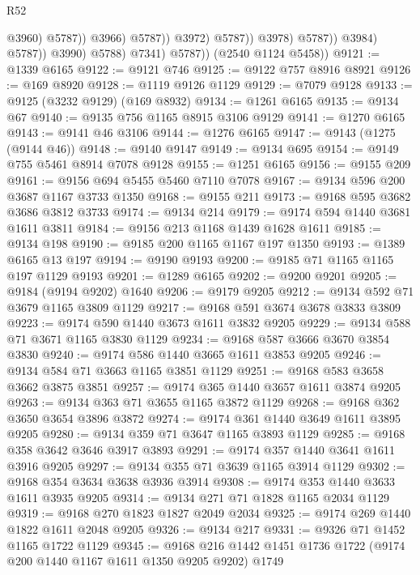 \begin{lexlean}{R52}
\begin{coremodule}
                                              @3960)
                                            @5787))
                                        @3966)
                                      @5787))
                                  @3972)
                                @5787))
                            @3978)
                          @5787))
                      @3984)
                    @5787))
                @3990)
              @5788)
            @7341)
          @5787))
      (@2540 @1124 @5458))
@9121 := @1339 @6165
@9122 := @9121 @746
@9125 := @9122 @757 @8916 @8921
@9126 := @169 @8920
@9128 := @1119 @9126 @1129
@9129 := @7079 @9128
@9133 := @9125 (@3232 @9129) (@169 @8932)
@9134 := @1261 @6165
@9135 := @9134 @67
@9140 := @9135 @756 @1165 @8915 @3106 @9129
@9141 := @1270 @6165
@9143 := @9141 @46 @3106
@9144 := @1276 @6165
@9147 := @9143 (@1275 (@9144 @46))
@9148 := @9140 @9147
@9149 := @9134 @695
@9154 := @9149 @755 @5461 @8914 @7078 @9128
@9155 := @1251 @6165
@9156 := @9155 @209
@9161 := @9156 @694 @5455 @5460 @7110 @7078
@9167 := @9134 @596 @200 @3687 @1167 @3733 @1350
@9168 := @9155 @211
@9173 := @9168 @595 @3682 @3686 @3812 @3733
@9174 := @9134 @214
@9179 := @9174 @594 @1440 @3681 @1611 @3811
@9184 := @9156 @213 @1168 @1439 @1628 @1611
@9185 := @9134 @198
@9190 := @9185 @200 @1165 @1167 @197 @1350
@9193 := @1389 @6165 @13 @197
@9194 := @9190 @9193
@9200 := @9185 @71 @1165 @1165 @197 @1129 @9193
@9201 := @1289 @6165
@9202 := @9200 @9201
@9205 := @9184 (@9194 @9202) @1640
@9206 := @9179 @9205
@9212 := @9134 @592 @71 @3679 @1165 @3809 @1129
@9217 := @9168 @591 @3674 @3678 @3833 @3809
@9223 := @9174 @590 @1440 @3673 @1611 @3832 @9205
@9229 := @9134 @588 @71 @3671 @1165 @3830 @1129
@9234 := @9168 @587 @3666 @3670 @3854 @3830
@9240 := @9174 @586 @1440 @3665 @1611 @3853 @9205
@9246 := @9134 @584 @71 @3663 @1165 @3851 @1129
@9251 := @9168 @583 @3658 @3662 @3875 @3851
@9257 := @9174 @365 @1440 @3657 @1611 @3874 @9205
@9263 := @9134 @363 @71 @3655 @1165 @3872 @1129
@9268 := @9168 @362 @3650 @3654 @3896 @3872
@9274 := @9174 @361 @1440 @3649 @1611 @3895 @9205
@9280 := @9134 @359 @71 @3647 @1165 @3893 @1129
@9285 := @9168 @358 @3642 @3646 @3917 @3893
@9291 := @9174 @357 @1440 @3641 @1611 @3916 @9205
@9297 := @9134 @355 @71 @3639 @1165 @3914 @1129
@9302 := @9168 @354 @3634 @3638 @3936 @3914
@9308 := @9174 @353 @1440 @3633 @1611 @3935 @9205
@9314 := @9134 @271 @71 @1828 @1165 @2034 @1129
@9319 := @9168 @270 @1823 @1827 @2049 @2034
@9325 := @9174 @269 @1440 @1822 @1611 @2048 @9205
@9326 := @9134 @217
@9331 := @9326 @71 @1452 @1165 @1722 @1129
@9345 := @9168 @216 @1442 @1451 @1736 @1722 (@9174 @200 @1440 @1167 @1611 @1350 @9205 @9202) @1749

\end{coremodule}
\end{lexlean}

